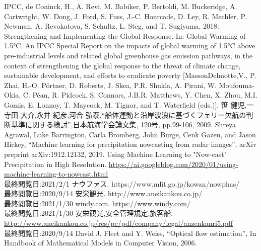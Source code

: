 \def\line{−\hspace*{-.7zw}−}

\begin{thebibliography}{99}


IPCC, de Coninck, H., A. Revi, M. Babiker, P. Bertoldi, M. Buckeridge, A. Cartwright, W. Dong, J. Ford, S. Fuss, J.-C. Hourcade, D. Ley, R. Mechler, P. Newman, A. Revokatova, S. Schultz, L. Steg, and T. Sugiyama, 2018: Strengthening and Implementing the Global Response. In: Global Warming of 1.5°C. An IPCC Special Report on the impacts of global warming of 1.5°C above pre-industrial levels and related global greenhouse gas emission pathways, in the context of strengthening the global response to the threat of climate change, sustainable development, and efforts to eradicate poverty [MassonDelmotte,V., P. Zhai, H.-O. P\"{o}rtner, D. Roberts, J. Skea, P.R. Shukla, A. Pirani, W. Moufouma-Okia, C. P\'{e}an, R. Pidcock, S. Connors, J.B.R. Matthews, Y. Chen, X. Zhou, M.I. Gomis, E. Lonnoy, T. Maycock, M. Tignor, and T. Waterfield (eds.)]. 
 笹 健児,一寺田 大介,永井 紀彦,河合 弘泰,``船体運動と沿岸波浪に基づくフェリー欠航の判断基準に関する検討'',日本航海学会論文集, 120号, pp.99-106, 2009.
 Shreya Agrawal, Luke Barrington, Carla Bromberg, John Burge, Cenk Gazen, and Jason Hickey, ``Machine learning for precipitation nowcasting from radar images'', arXiv preprint arXiv:1912.12132, 2019.
Using Machine Learning to "Now-cast" Precipitation in High Resolution. \url{https://ai.googleblog.com/2020/01/using-machine-learning-to-nowcast.html}
\\最終閲覧日:2021/2/1
 ナウファス. https://www.mlit.go.jp/kowan/nowphas/ \\最終閲覧日:2020/9/14
 安栄観光. http://www.aneikankou.co.jp/ \\最終閲覧日:2021/1/30
windy.com. \url{https://www.windy.com/} \\最終閲覧日:2021/1/30
安栄観光,安全管理規定,旅客船. \\ \url{http://www.aneikankou.co.jp/res/pc/pdf/company/legal/anzenkanri5.pdf} \\最終閲覧日:2020/9/14
David J. Fleet and Y. Weiss, ``Optical flow estimation'', In Handbook of Mathematical Models in Computer Vision, 2006.

\end{thebibliography}
